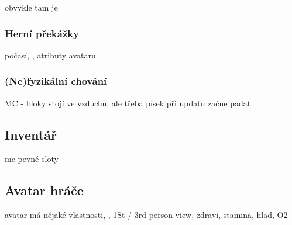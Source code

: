 obvykle tam je

\subsubsection{Herní překážky}

počasí, \NPC{}, atributy avataru

\subsubsection{(Ne)fyzikální chování}

MC - bloky stojí ve vzduchu, ale třeba písek při updatu začne padat

\subsection{Inventář}

mc pevné sloty

\subsection{Avatar hráče}
avatar má nějaké vlastnosti, \HUD{}, 1St / 3rd person view, zdraví, stamina, hlad, O2




